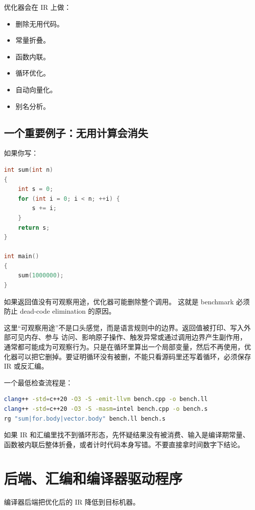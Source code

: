 优化器会在 IR 上做：

\begin{itemize}
  \item 删除无用代码。
  \item 常量折叠。
  \item 函数内联。
  \item 循环优化。
  \item 自动向量化。
  \item 别名分析。
\end{itemize}

\subsection{一个重要例子：无用计算会消失}

如果你写：

\begin{lstlisting}[language=C++]
int sum(int n)
{
    int s = 0;
    for (int i = 0; i < n; ++i) {
        s += i;
    }
    return s;
}

int main()
{
    sum(1000000);
}
\end{lstlisting}

如果返回值没有可观察用途，优化器可能删除整个调用。  
这就是 benchmark 必须防止 dead-code elimination 的原因。

这里“可观察用途”不是口头感觉，而是语言规则中的边界。返回值被打印、写入外部可见内存、参与  访问、影响原子操作、触发异常或通过调用边界产生副作用，通常都可能成为可观察行为。只是在循环里算出一个局部变量，然后不再使用，优化器可以把它删掉。要证明循环没有被删，不能只看源码里还写着循环，必须保存 IR 或反汇编。

一个最低检查流程是：

\begin{lstlisting}[language=bash,caption={确认 benchmark 热循环没有消失}]
clang++ -std=c++20 -O3 -S -emit-llvm bench.cpp -o bench.ll
clang++ -std=c++20 -O3 -S -masm=intel bench.cpp -o bench.s
rg "sum|for.body|vector.body" bench.ll bench.s
\end{lstlisting}

如果 IR 和汇编里找不到循环形态，先怀疑结果没有被消费、输入是编译期常量、函数被内联后整体折叠，或者计时代码本身写错。不要直接拿时间数字下结论。

\section{后端、汇编和编译器驱动程序}

编译器后端把优化后的 IR 降低到目标机器。

